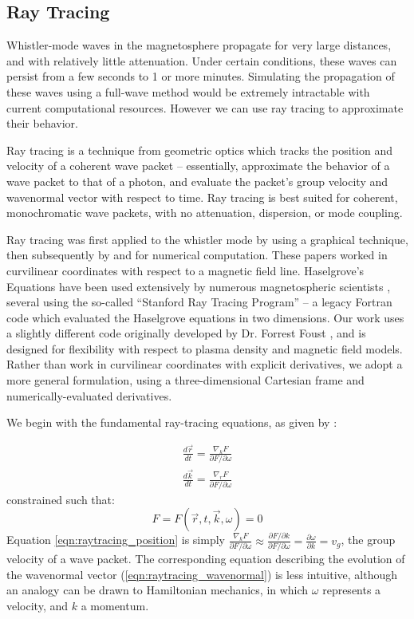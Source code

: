 \label{section:raytracing}
\subsection{Ray Tracing}
Whistler-mode waves in the magnetosphere propagate for very large distances, and with relatively little attenuation. Under certain conditions, these waves can persist from a few seconds to 1 or more minutes. Simulating the propagation of these waves using a full-wave method would be extremely intractable with current computational resources. However we can use ray tracing to approximate their behavior.

Ray tracing is a technique from geometric optics which tracks the position and velocity of a coherent wave packet -- essentially, approximate the behavior of a wave packet to that of a photon, and evaluate the packet's group velocity and wavenormal vector with respect to time. Ray tracing is best suited for coherent, monochromatic wave packets, with no attenuation, dispersion, or mode coupling. 

Ray tracing was first applied to the whistler mode by \cite{Haselgrove1955} using a graphical technique, then subsequently by \cite{Haselgrove1960} and \cite{Kimura1966} for numerical computation. These papers worked in curvilinear coordinates with respect to a magnetic field line. Haselgrove's Equations have been used extensively by numerous magnetospheric scientists \citep{Kimura1966, Edgar1972, Ngo1989,Ristic1993, Lauben1998, B.Peter2007, Bortnik2005, Kulkarni2009}, several using the so-called ``Stanford Ray Tracing Program'' -- a legacy Fortran code which evaluated the Haselgrove equations in two dimensions. Our work uses a slightly different code originally developed by Dr. Forrest Foust \citep{Golden2010}, and is designed for flexibility with respect to plasma density and magnetic field models. Rather than work in curvilinear coordinates with explicit derivatives, we adopt a more general formulation, using a three-dimensional Cartesian frame and numerically-evaluated derivatives.

We begin with the fundamental ray-tracing equations, as given by \cite{Haselgrove1960, Stix1992}:

\begin{eqnarray}
\frac{d\vec{r}}{dt} = \frac{\nabla_kF}{\partial F/\partial \omega} \label{eqn:raytracing_position}\\
\frac{d\vec{k}}{dt} = \frac{\nabla_rF}{\partial F/\partial \omega} \label{eqn:raytracing_wavenormal}
\end{eqnarray}
constrained such that:
\begin{equation}
F = F(\vec{r},t,\vec{k},\omega) = 0
\end{equation}
Equation \ref{eqn:raytracing_position} is simply $\frac{\nabla_kF}{\partial F/\partial \omega} \approx\frac{\partial F/\partial k}{\partial F /\partial \omega} = \frac{\partial \omega}{\partial k} = v_g$, the group velocity of a wave packet. The corresponding equation describing the evolution of the wavenormal vector (\ref{eqn:raytracing_wavenormal}) is less intuitive, although an analogy can be drawn to Hamiltonian mechanics, in which $\omega$ represents a velocity, and $k$ a momentum.

